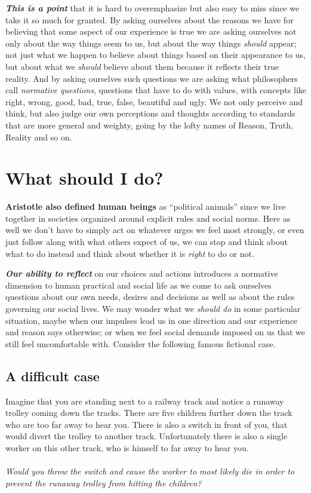 \documentclass[
  12pt, openany]{book}
\makeatletter
\newenvironment{kframe}{%
\medskip{}
\setlength{\fboxsep}{.8em}
 \def\at@end@of@kframe{}%
 \ifinner\ifhmode%
  \def\at@end@of@kframe{\end{minipage}}%
  \begin{minipage}{\columnwidth}%
 \fi\fi%
 \def\FrameCommand##1{\hskip\@totalleftmargin \hskip-\fboxsep
 \colorbox{shadecolor}{##1}\hskip-\fboxsep
     \hskip-\linewidth \hskip-\@totalleftmargin \hskip\columnwidth}%
 \MakeFramed {\advance\hsize-\width
   \@totalleftmargin\z@ \linewidth\hsize
   \@setminipage}}%
 {\par\unskip\endMakeFramed%
 \at@end@of@kframe}
\newenvironment{rmdblock}[1]
  {
  \begin{itemize}
  \renewcommand{\labelitemi}{
    \raisebox{-.7\height}[0pt][0pt]{
      {\setkeys{Gin}{width=3em,keepaspectratio}\texttt{[image: img/\#1]}}
    }
  }
  \setlength{\fboxsep}{1em}
  \begin{kframe}
  \item
  }
  {
  \end{kframe}
  \end{itemize}
  }
\newenvironment{question}
  {\begin{rmdblock}{question}}
  {\end{rmdblock}}
\theoremstyle{definition}
\theoremstyle{definition}
\theoremstyle{definition}
\theoremstyle{definition}
\theoremstyle{remark}
\makeatother
\begin{document}
\textbf{\emph{This is a point}} that it is hard to overemphasize but also easy to miss since we take it so much for granted. By asking ourselves about the reasons we have for believing that some aspect of our experience is true we are asking ourselves not only about the way things seem to us, but about the way things \emph{should} appear; not just what we happen to believe about things based on their appearance to us, but about what we \emph{should} believe about them because it reflects their true reality. And by asking ourselves such questions we are asking what philosophers call \emph{normative questions}, questions that have to do with values, with concepts like right, wrong, good, bad, true, false, beautiful and ugly. We not only perceive and think, but also judge our own perceptions and thoughts according to standards that are more general and weighty, going by the lofty names of Reason, Truth, Reality and so on.

\hypertarget{what-should-i-do}{%
\section{What should I do?}\label{what-should-i-do}}

\textbf{Aristotle also defined human beings} as ``political animals'' since we live together in societies organized around explicit rules and social norms. Here as well we don't have to simply act on whatever urges we feel most strongly, or even just follow along with what others expect of us, we can stop and think about what to do instead and think about whether it is \emph{right} to do or not.

\textbf{\emph{Our ability to reflect}} on our choices and actions introduces a normative dimension to human practical and social life as we come to ask ourselves questions about our own needs, desires and decisions as well as about the rules governing our social lives. We may wonder what we \emph{should do} in some particular situation, maybe when our impulses lead us in one direction and our experience and reason says otherwise; or when we feel social demands imposed on us that we still feel uncomfortable with. Consider the following famous fictional case.

\hypertarget{a-difficult-case}{%
\subsection*{A difficult case}\label{a-difficult-case}}


\begin{question}
Imagine that you are standing next to a railway track and notice a runaway trolley coming down the tracks. There are five children further down the track who are too far away to hear you. There is also a switch in front of you, that would divert the trolley to another track. Unfortunately there is also a single worker on this other track, who is himself to far away to hear you.\\
~\\
\emph{Would you throw the switch and cause the worker to most likely die in order to prevent the runaway trolley from hitting the children?}

\end{question}
\end{document}
